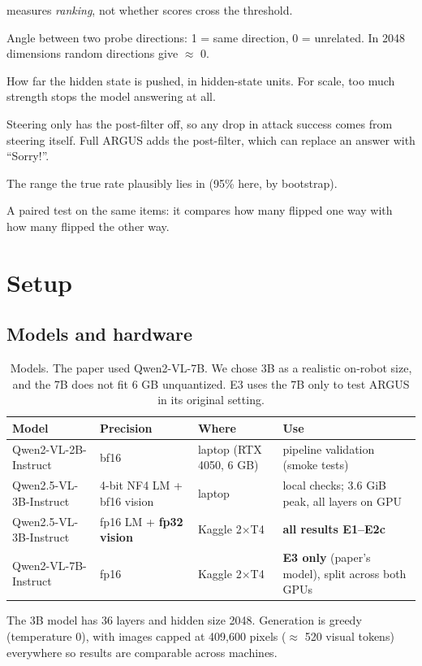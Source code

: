 \documentclass[11pt,a4paper]{article}
\begin{document}
\begin{description}[leftmargin=0pt,style=nextline]
measures \emph{ranking}, not whether scores cross the threshold.
\item[Cosine similarity] Angle between two probe directions: 1 = same direction, 0 = unrelated. In 2048 dimensions random directions give $\approx$ 0.
\item[Steering strength $\alpha$] How far the hidden state is pushed, in hidden-state units. For scale, too much strength stops the model answering at all.
\item[Steering only / full ARGUS] Steering only has the post-filter off, so any drop in attack success comes from steering itself. Full ARGUS adds the post-filter, which can replace an answer with ``Sorry!''.
\item[Confidence interval (CI)] The range the true rate plausibly lies in (95\% here, by bootstrap).
\item[McNemar test] A paired test on the same items: it compares how many flipped one way with how many flipped the other way.
\end{description}

\section{Setup}

\subsection{Models and hardware}
\begin{table}[H]\centering\small
\begin{tabularx}{\linewidth}{lllL}
\toprule
Model & Precision & Where & Use \\
\midrule
Qwen2-VL-2B-Instruct & bf16 & laptop (RTX 4050, 6 GB) & pipeline validation (smoke tests) \\
Qwen2.5-VL-3B-Instruct & 4-bit NF4 LM + bf16 vision & laptop & local checks; 3.6 GiB peak, all layers on GPU \\
Qwen2.5-VL-3B-Instruct & fp16 LM + \textbf{fp32 vision} & Kaggle 2$\times$T4 & \textbf{all results E1--E2c} \\
Qwen2-VL-7B-Instruct & fp16 & Kaggle 2$\times$T4 & \textbf{E3 only} (paper's model), split across both GPUs \\
\bottomrule
\end{tabularx}
\caption{Models. The paper used Qwen2-VL-7B. We chose 3B as a realistic on-robot size, and the 7B does not fit 6 GB unquantized. E3 uses the 7B only to test ARGUS in its original setting.}
\end{table}
The 3B model has 36 layers and hidden size 2048. Generation is greedy (temperature 0), with images capped at 409{,}600 pixels
($\approx$ 520 visual tokens) everywhere so results are comparable across machines.
\end{document}

